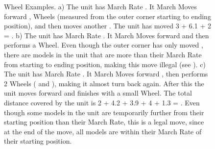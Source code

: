 \begin{figure}[!htbp]
\centering
\hypertarget{wheels_figure}{
\def\svgwidth{\textwidth}
}
\caption{Wheel Examples.\captionpar
a) The unit has March Rate . It March Moves forward , Wheels  (measured from the outer corner starting to ending position), and then moves another . The unit has moved 3 + 6.1 + 2 = .\captionpar
b) The unit has March Rate . It March Moves forward  and then performs a  Wheel. Even though the outer corner has only moved , there are models in the unit that are more than their March Rate from starting to ending position, making this move illegal (see ).\captionpar
c) The unit has March Rate . It March Moves forward , then performs 2 Wheels ( and ), making it almost turn back again. After this the unit moves forward  and finishes with a small  Wheel. The total distance covered by the unit is 2 + 4.2 + 3.9 + 4 + 1.3 = .\newline
Even though some models in the unit are temporarily further from their starting position than their March Rate, this is a legal move, since at the end of the move, all models are within their March Rate of their starting position.}
\label{figure/wheels}
\end{figure}
